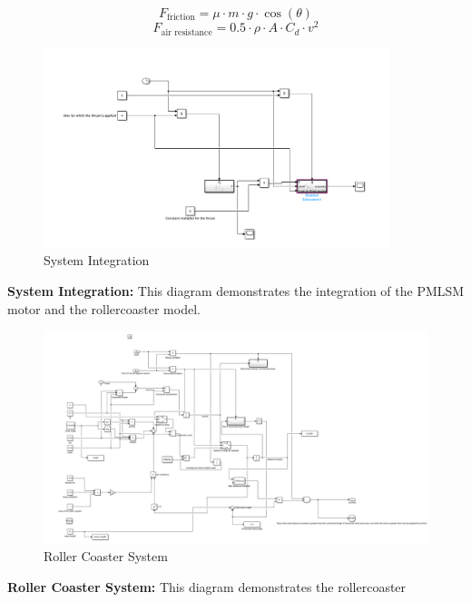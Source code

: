 \documentclass{article}
\begin{document}
    \begin{equation}
        F_{\text{friction}}= \mu \cdot m \cdot g \cdot \cos(\theta)
    \end{equation}
    \begin{equation}
        F_{\text{air resistance}}= 0.5 \cdot \rho \cdot A \cdot C_{d}\cdot v^{2}
    \end{equation}
    \begin{figure}[H]
        \centering
        \includegraphics[width=0.9\textwidth]{
            ./Snapshots/system_integration.png
        } %
        \caption{System Integration}
        \label{fig:System Integration}
    \end{figure}
    \textbf{System Integration:} This diagram demonstrates the integration of
    the PMLSM motor and the rollercoaster model.
    \begin{figure}[H]
        \centering
        \includegraphics[width=1\textwidth]{
            ./Snapshots/Main_Block.png
        } %
        \caption{Roller Coaster System}
        \label{fig:Roller Coaster System}
    \end{figure}
    \textbf{Roller Coaster System:} This diagram demonstrates the rollercoaster
\end{document}
